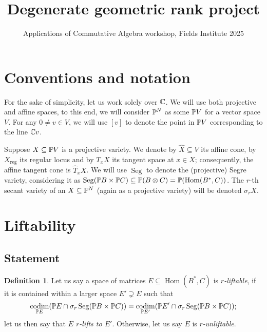 \documentclass[a4paper,10pt]{article}
\title{Degenerate geometric rank project}
\author{Applications of Commutative Algebra workshop, Fields Institute 2025}
\date{}
\def\reg{\text{reg}}
\DeclareMathOperator{\Hom}{Hom}\let\hom\Hom
\DeclareMathOperator{\codim}{codim}
\DeclareMathOperator{\Seg}{Seg}
\theoremstyle{definition}
\newtheorem{definition}[theorem]{Definition}
\theoremstyle{remark}
\begin{document}
\maketitle

\setcounter{section}{-1}
\section{Conventions and notation}
For the sake of simplicity, let us work solely over $\ce$.
We will use both projective and affine spaces, to this end, we will consider $\pe^N$ as some $\pe V$ for a vector space $V$. For any $0\neq v\in V$, we will use $[v]$ to denote the point in $\pe V$ corresponding to the line $\ce v$.

Suppose $X\subseteq\pe V$ is a projective variety. We denote by $\hat X\subseteq V$ its affine cone, by $X_\reg$ its regular locus and by $T_xX$ its tangent space at $x\in X$; consequently, the affine tangent cone is $\hat T_x X$. We will use $\Seg$ to denote the (projective) Segre variety, considering it as $\Seg(\pe B\times\pe C)\subseteq  \pe(B\otimes C)= \pe(\Hom(B^*, C))$. The $r$-th secant variety of an $X\subseteq\pe^N$ (again as a projective variety) will be denoted $\sigma_r X$.

\section{Liftability}

\subsection{Statement}

\begin{definition}
    Let us say a space of matrices $E\subseteq \Hom(B^*,C)$ is \emph{$r$-liftable}, if it is contained within a larger space $E'\supsetneq E$ such that
    \[
        \codim_{\pe E}(\pe E\cap \sigma_r\Seg(\pe B\times\pe C)) = \codim_{\pe E'}({\pe E'}\cap \sigma_r\Seg(\pe B\times\pe C));
    \]
    let us then say that \emph{$E$ $r$-lifts to $E'$}.
    Otherwise, let us say $E$ is \emph{$r$-unliftable}.
\end{definition}
\end{document}
